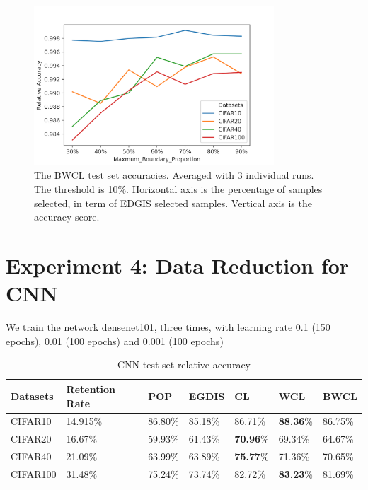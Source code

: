\begin{figure}[H]
 \centering
 \includegraphics[width=0.8\textwidth]{src/bwcl_relative_size04.png}
 \caption{The BWCL test set accuracies. Averaged with 3 individual runs. The threshold is 10\%. Horizontal axis is the percentage of samples selected, in term of EDGIS selected samples. Vertical axis is the accuracy score.}
 \label{Fig.logistic_subsets}
 \end{figure}

\section{Experiment 4: Data Reduction for CNN}
\label{CNN}
We train the network densenet101, three times, with learning rate 0.1 (150 epochs), 0.01 (100 epochs) and 0.001 (100 epochs)

\begin{table}[H]
    \centering
    \begin{tabular}{|l|l|l|l|l|l|l|}
    \hline
        Datasets & Retention Rate  & POP & EGDIS & CL & WCL & BWCL \\ \hline
        CIFAR10 & 14.915\% & 86.80\% & 85.18\% & 86.71\% &\textbf{88.36}\% & 86.75\% \\ \hline
        CIFAR20 & 16.67\% & 59.93\% & 61.43\% & \textbf{70.96}\% & 69.34\% & 64.67\% \\ \hline
        CIFAR40 & 21.09\% & 63.99\% & 63.89\% & \textbf{75.77}\% & 71.36\% & 70.65\% \\ \hline
        CIFAR100 & 31.48\% & 75.24\% & 73.74\% & 82.72\% & \textbf{83.23}\% & 81.69\% \\ \hline
    \end{tabular}
    \caption{CNN test set relative accuracy}
    \label{132e3213}
\end{table}

